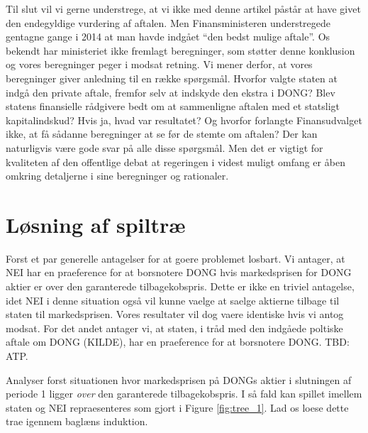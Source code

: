 \documentclass{article}
\begin{document}
Til slut vil vi gerne understrege, at vi ikke med denne artikel påstår at have givet den endegyldige vurdering af aftalen. Men Finansministeren understregede gentagne gange i 2014 at man havde indgået \enquote{den bedst mulige aftale}. 
Os bekendt har ministeriet ikke fremlagt beregninger, som støtter denne konklusion og vores beregninger peger i modsat retning. Vi mener derfor, at vores beregninger giver anledning til en række spørgsmål. Hvorfor valgte staten at indgå den private aftale, fremfor selv at indskyde den ekstra i DONG? Blev statens finansielle rådgivere bedt om at sammenligne aftalen med et statsligt kapitalindskud? Hvis ja, hvad var resultatet? Og hvorfor forlangte Finansudvalget ikke, at få  sådanne beregninger at se før de stemte om aftalen? Der kan naturligvis være gode svar på alle disse spørgsmål. Men det er vigtigt for kvaliteten af den offentlige debat at regeringen i videst muligt omfang er åben omkring detaljerne i sine beregninger og rationaler.

\newpage

\appendix

\FloatBarrier

\section{Løsning af spiltræ}
\label{sec:app_tree}
Forst et par generelle antagelser for at goere problemet losbart. Vi antager, at NEI har en praeference for at borsnotere DONG hvis markedsprisen for DONG aktier er over den garanterede tilbagekobspris. Dette er ikke en triviel antagelse, idet NEI i denne situation også vil kunne vaelge at saelge aktierne tilbage til staten til markedsprisen. Vores resultater vil dog vaere identiske hvis vi antog modsat. For det andet antager vi, at staten, i tråd med den indgåede poltiske aftale om DONG (KILDE), har en praeference for at borsnotere DONG. TBD: ATP.

Analyser forst situationen hvor markedsprisen på DONGs aktier i slutningen af periode 1 ligger \textit{over} den garanterede tilbagekobspris. I så fald kan spillet imellem staten og NEI repraesenteres som gjort i Figure \ref{fig:tree_1}. Lad os loese dette trae igennem baglæns induktion.  
\end{document}
